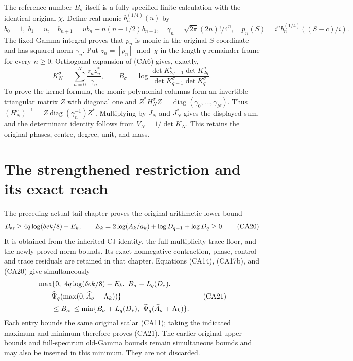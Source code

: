 The reference number $B_\sigma$ itself is a fully specified finite
calculation with the identical original $\chi$.  Define real monic
$b_n^{(1/4)}(u)$ by
\[
 b_0=1,\; b_1=u,\quad
 b_{n+1}=ub_n-n(n-1/2)b_{n-1},\quad
 \gamma_n=\sqrt{2\pi}(2n)!/4^n,
 \quad p_n(S)=i^n b_n^{(1/4)}((S-c)/i).
 \tag{CA18}
\]
The fixed Gamma integral proves that $p_n$ is monic in the original
$S$ coordinate and has squared norm $\gamma_n$.  Put $z_n=[p_n]\bmod\chi$
in the length-$q$ remainder frame for every $n\ge0$.
Orthogonal expansion of (CA6) gives, exactly,
\[
 K_N^\sigma=\sum_{n=0}^N\frac{z_nz_n^*}{\gamma_n},\qquad
 B_\sigma=\log\frac{\det K_{2q-1}^\sigma\det K_{2q}^\sigma}
 {\det K_{q-1}^\sigma\det K_q^\sigma}.
 \tag{CA19}
\]
To prove the kernel formula, the monic polynomial columns form an
invertible triangular matrix $Z$ with diagonal one and
$Z^*H_N^\sigma Z=\operatorname{diag}(\gamma_0,\ldots,\gamma_N)$.
Thus $(H_N^\sigma)^{-1}=Z\operatorname{diag}(\gamma_n^{-1})Z^*$.
Multiplying by $J_N$ and $J_N^*$ gives the displayed sum, and the
determinant identity follows from $V_N=1/\det K_N$.
This retains the original phases, centre, degree, unit, and mass.

\section{The strengthened restriction and its exact reach}

The preceding actual-tail chapter proves the original arithmetic lower
bound
\[
 B_{\rm ar}\ge4q\log(\delta e k/8)-E_k,\qquad
 E_k=2\log(A_k/a_k)+\log D_{q-1}+\log D_q\ge0.
 \tag{CA20}
\]
It is obtained from the inherited CJ identity, the full-multiplicity
trace floor, and the newly proved norm bounds.  Its exact nonnegative
contraction, phase, control and trace residuals are retained in that
chapter.  Equations (CA14), (CA17b), and (CA20) give simultaneously
\[
 \begin{aligned}
 &\max\{0,\ 4q\log(\delta e k/8)-E_k,\ B_\sigma-L_q(D_*),\\
 &\qquad\widehat\Psi_q(\max(0,\widehat A_\sigma-\Lambda_k))\}
 \\&\qquad\le B_{\rm ar}\le
 \min\{B_\sigma+L_q(D_*),\ \widehat\Psi_q(\widehat A_\sigma+\Lambda_k)\}.
 \end{aligned}
 \tag{CA21}
\]
Each entry bounds the same original scalar (CA11); taking the indicated
maximum and minimum therefore proves (CA21).  The earlier original
upper bounds and full-spectrum old-Gamma bounds remain simultaneous
bounds and may also be inserted in this minimum.  They are not discarded.

